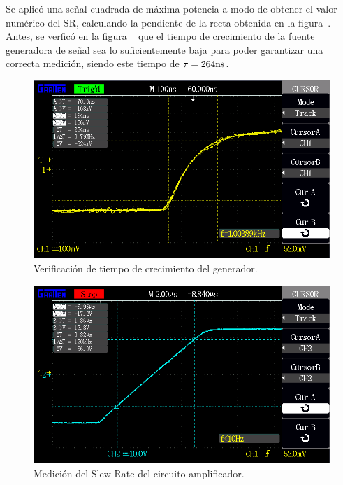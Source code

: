 Se aplicó una señal cuadrada de máxima potencia a modo de obtener el valor numérico del SR, calculando la pendiente de la recta obtenida en la figura~. Antes, se verficó en la figura  ~ que el tiempo de crecimiento de la fuente generadora de señal sea lo suficientemente baja para poder garantizar una correcta medición, siendo este tiempo de $\tau = 264 \si[per-mode=symbol]{\nano\second}$.


\begin{figure}[H]
        \centering
        \includegraphics[width=0.95 \textwidth]{./img/mediciones/Slew_Rate/1.png}
        \caption{Verificación de tiempo de crecimiento del generador.}
        \label{fig:Slew_rate_gen}
\end{figure}

\vfill

\clearpage

\begin{figure}[H]
        \centering
        \includegraphics[width=0.95 \textwidth]{./img/mediciones/Slew_Rate/2.png}
        \caption{Medición del Slew Rate del circuito amplificador.}
        \label{fig:Slew_rate_amplifier}
\end{figure}

